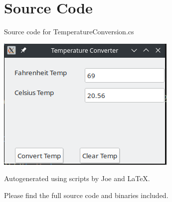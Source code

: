 \documentclass[12pt]{article}
\begin{document}
\maketitle
\pagebreak


\section{Source Code}

Source code for \textsf{TemperatureConversion.cs}


\newpage


\includegraphics{scr.png}

\newpage

Autogenerated using scripts by Joe and \LaTeX.

Please find the full source code and binaries included.
\end{document}
